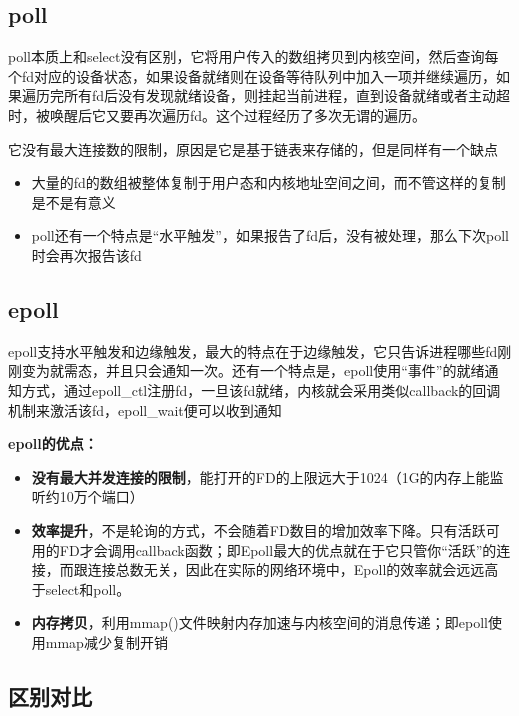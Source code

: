 \documentclass[UTF8,a4paper,12pt]{ctexbook}
\begin{document}
		\subsection{poll}
			poll本质上和select没有区别，它将用户传入的数组拷贝到内核空间，然后查询每个fd对应的设备状态，如果设备就绪则在设备等待队列中加入一项并继续遍历，如果遍历完所有fd后没有发现就绪设备，则挂起当前进程，直到设备就绪或者主动超时，被唤醒后它又要再次遍历fd。这个过程经历了多次无谓的遍历。
		
			它没有最大连接数的限制，原因是它是基于链表来存储的，但是同样有一个缺点
			\begin{itemize}
				\item  大量的fd的数组被整体复制于用户态和内核地址空间之间，而不管这样的复制是不是有意义
				\item  poll还有一个特点是“水平触发”，如果报告了fd后，没有被处理，那么下次poll时会再次报告该fd
			\end{itemize}
		
		\subsection{epoll}
			epoll支持水平触发和边缘触发，最大的特点在于边缘触发，它只告诉进程哪些fd刚刚变为就需态，并且只会通知一次。还有一个特点是，epoll使用“事件”的就绪通知方式，通过epoll\_ctl注册fd，一旦该fd就绪，内核就会采用类似callback的回调机制来激活该fd，epoll\_wait便可以收到通知
			
			\textbf{epoll的优点：}
			\begin{itemize}
				\item \textbf{没有最大并发连接的限制}，能打开的FD的上限远大于1024（1G的内存上能监听约10万个端口）
				
				\item \textbf{效率提升}，不是轮询的方式，不会随着FD数目的增加效率下降。只有活跃可用的FD才会调用callback函数；即Epoll最大的优点就在于它只管你“活跃”的连接，而跟连接总数无关，因此在实际的网络环境中，Epoll的效率就会远远高于select和poll。
				
				\item \textbf{内存拷贝}，利用mmap()文件映射内存加速与内核空间的消息传递；即epoll使用mmap减少复制开销
			\end{itemize}
		
		\subsection{区别对比}
\end{document}
